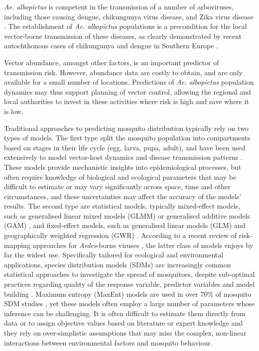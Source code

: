 \documentclass[preprint,12pt]{elsarticle}
\begin{document}
\emph{Ae. albopictus} is competent in the transmission of a number of arboviruses, including those causing dengue, chikungunya virus disease, and Zika virus disease \cite{kraemer2015}. The establishment of \emph{Ae. albopictus} populations is a precondition for the local vector-borne transmission of these diseases, as clearly demonstrated by recent autochthonous cases of chikungunya and dengue in Southern Europe \cite{Rezza2007, Cattaneo2023}. 

Vector abundance, amongst other factors, is an important predictor of transmission risk. However, abundance data are costly to obtain, and are only available for a small number of locations. Predictions of \textit{Ae. albopictus} population dynamics may thus support planning of vector control, allowing the regional and local authorities to invest in these activities where risk is high and save where it is low.

Traditional approaches to predicting mosquito distribution typically rely on two types of models. The first type split the mosquito population into compartments based on stages in their life cycle (egg, larva, pupa, adult), and have been used extensively to model vector-host dynamics and disease transmission patterns \cite{guzzetta2016, Kioutsioukis2019,  li2019, tran2020, angelou2021, dare2022, davis2024}. These models provide mechanistic insights into epidemiological processes, but often require  knowledge of biological and ecological parameters that may be difficult to estimate or may vary significantly across space, time and other circumstances, and these uncertainties may affect the accuracy of the models' results. The second type are statistical models, typically mixed-effect models, such as generalised linear mixed models (GLMM) or generalised additive models (GAM) \cite{Barman2025}, and fixed-effect models, such as generalised linear models (GLM) \cite{Stilianakis2016, zardini2024} and geographically weighted regression (GWR) \cite{Yang2021}. According to a recent review of risk-mapping approaches for \emph{Aedes}-borne viruses  \cite{Lim2023}, the latter class of models enjoys by far the widest use. Specifically tailored for ecological and environmental applications,  species distribution models (SDMs) are increasingly common statistical approaches to investigate the spread of mosquitoes, despite sub-optimal practices regarding quality of the response variable, predictor variables and model building \cite{Barker2022}. Maximum entropy (MaxEnt) models are used in over 70\% of mosquito SDM studies \cite{Lippi2023}, yet these models often employ a large number of parameters whose inference can be challenging. It is often difficult to estimate them directly from data or to assign objective values based on literature or expert knowledge and they rely on over-simplistic assumptions that may miss the complex, non-linear interactions between environmental factors and mosquito behaviour.
\end{document}

